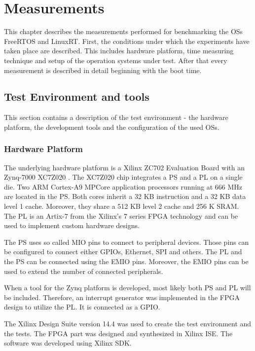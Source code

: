 \chapter{Measurements}\label{ch_measurements}
This chapter describes the measurements performed for benchmarking the \acp{OS} FreeRTOS and LinuxRT.
First, the conditions under which the experiments have taken place are described.
This includes hardware platform, time measuring technique and setup of the operation systems under test.
After that every measurement is described in detail beginning with the boot time.

\section{Test Environment and tools}
This section contains a description of the test environment - the hardware platform, the development tools and the configuration of the used \acp{OS}.
\subsection{Hardware Platform}
The underlying hardware platform is a Xilinx ZC702 Evaluation Board \cite{xilinx:zc702_ev_board} with an Zynq-7000 XC7Z020 \cite{xilinx:zynq7000}.
The XC7Z020 chip integrates a \ac{PS} and a \ac{PL} on a single die.
Two ARM Cortex-A9 MPCore application processors running at 666 MHz are located in the \ac{PS}.
Both cores inherit a 32 KB instruction and a 32 KB data level 1 cache.
Moreover, they share a 512 KB level 2 cache and 256 K SRAM.
The \ac{PL} is an Artix-7 from the Xilinx's 7 series FPGA technology and can be used to implement custom hardware designs.
\par
The \ac{PS} uses so called \ac{MIO} pins to connect to peripheral devices.
Those pins can be configured to connect either \acp{GPIO}, Ethernet, \ac{SPI} and others.
The \ac{PL} and the \ac{PS} can be connected using the \ac{EMIO} pins.
Moreover, the \ac{EMIO} pins can be used to extend the number of connected peripherals.
\par
When a tool for the Zynq platform is developed, most likely both \ac{PS} and \ac{PL} will be included.
Therefore, an interrupt generator was implemented in the  \ac{FPGA} design to utilize the \ac{PL}.
It is connected as a \ac{GPIO}.
\par
The Xilinx Design Suite version 14.4 was used to create the test environment and the tests.
The \ac{FPGA} part was designed and synthesized in Xilinx \ac{ISE}.
The software was developed using Xilinx \ac{SDK}.

